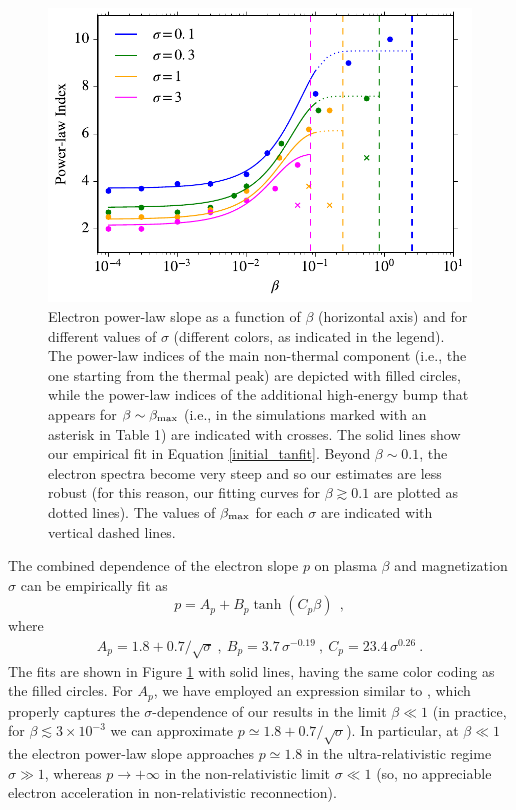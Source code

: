 \begin{figure}[!h]
\centering
\includegraphics[width =\textwidth]{powerlaw_fit.pdf}
\caption{Electron power-law slope as a function of $\beta$ (horizontal axis) and for different values of $\sigma$ (different colors, as indicated in the legend).  The power-law indices of the main non-thermal component (i.e., the one starting from the thermal peak) are depicted with filled circles, while the power-law indices of the additional high-energy bump that appears for $\beta\sim \beta_{\rm max}$ (i.e., in the simulations marked with an asterisk in Table 1) are indicated with crosses.  The solid lines show our empirical fit in Equation \ref{initial_tanfit}. Beyond $\beta\sim 0.1$, the electron spectra become very steep and so our estimates are less robust (for this reason, our fitting curves for $\beta\gtrsim 0.1$ are plotted as dotted lines).  The values of $\beta_{\rm{max}}$ for each $\sigma$ are indicated with vertical dashed lines.}
\label{powerlaw_fit}
\end{figure}

The combined dependence of the electron slope $p$ on plasma $\beta$ and magnetization $\sigma$ can be empirically fit as 
\begin{equation}
p = A_{p} + B_{p} \tanh{(C_{p}\beta)}~~,
\label{initial_tanfit}
\end{equation}
where
\begin{equation}
\begin{aligned}
A_{p}=1.8 + 0.7/\sqrt{\sigma}~,~B_{p}=3.7\,\sigma^{-0.19}~,~C_{p}=23.4\,\sigma^{0.26}   ~.   
\end{aligned}
\label{powerlaw_fit_params}
\end{equation}
The fits are shown in Figure \ref{powerlaw_fit}  with solid lines, having the same color coding as the filled circles. For $A_p$, we have employed an expression similar to \citet{werner2018}, which properly captures the $\sigma$-dependence of our results in the limit $\beta\ll1$ (in practice, for $\beta\lesssim 3\times 10^{-3}$ we can approximate $p\simeq 1.8 + 0.7/\sqrt{\sigma}$). In particular, at $\beta\ll1$ the electron power-law slope approaches $p\simeq 1.8$ in the ultra-relativistic regime $\sigma\gg1$, whereas $p\rightarrow+\infty$ in the non-relativistic limit $\sigma\ll1$ (so, no appreciable electron acceleration in non-relativistic reconnection).

